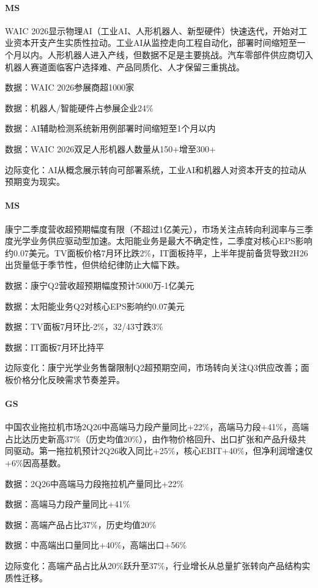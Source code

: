 \documentclass[11pt]{ctexart}
\begin{document}
\paragraph{MS} WAIC 2026显示物理AI（工业AI、人形机器人、新型硬件）快速迭代，开始对工业资本开支产生实质性拉动。工业AI从监控走向工程自动化，部署时间缩短至一个月以内。人形机器人进入产线，但数据不足是主要挑战。汽车零部件供应商切入机器人赛道面临客户选择难、产品同质化、人才保留三重挑战。
{\small\color{refgray}数据：WAIC 2026参展商超1000家\par}
{\small\color{refgray}数据：机器人/智能硬件占参展企业24\%\par}
{\small\color{refgray}数据：AI辅助检测系统新用例部署时间缩短至1个月以内\par}
{\small\color{refgray}数据：WAIC 2026双足人形机器人数量从150+增至300+\par}
{\small\color{refgray}边际变化：AI从概念展示转向可部署系统，工业AI和机器人对资本开支的拉动从预期变为现实。\par}
\paragraph{MS} 康宁二季度营收超预期幅度有限（不超过1亿美元），市场关注点转向利润率与三季度光学业务供应驱动型加速。太阳能业务是最大不确定性，二季度对核心EPS影响约0.07美元。TV面板价格7月环比跌2\%，IT面板持平，上半年提前备货导致2H26出货量低于季节性，但供给纪律防止大幅下跌。
{\small\color{refgray}数据：康宁Q2营收超预期幅度预计5000万-1亿美元\par}
{\small\color{refgray}数据：太阳能业务Q2对核心EPS影响约0.07美元\par}
{\small\color{refgray}数据：TV面板7月环比-2\%，32/43寸跌3\%\par}
{\small\color{refgray}数据：IT面板7月环比持平\par}
{\small\color{refgray}边际变化：康宁光学业务售罄限制Q2超预期空间，市场转向关注Q3供应改善；面板价格分化反映需求节奏差异。\par}
\paragraph{GS} 中国农业拖拉机市场2Q26中高端马力段产量同比+22\%，高端马力段+41\%，高端占比达历史新高37\%（历史均值20\%），由作物价格回升、出口扩张和产品升级共同驱动。第一拖拉机预计2Q26收入同比+25\%，核心EBIT+40\%，但净利润增速仅+6\%因高基数。
{\small\color{refgray}数据：2Q26中高端马力段拖拉机产量同比+22\%\par}
{\small\color{refgray}数据：高端马力段产量同比+41\%\par}
{\small\color{refgray}数据：高端产品占比37\%，历史均值20\%\par}
{\small\color{refgray}数据：中高端出口量同比+40\%，高端出口+56\%\par}
{\small\color{refgray}边际变化：高端产品占比从20\%跃升至37\%，行业增长从总量扩张转向产品结构实质性迁移。\par}
\end{document}
